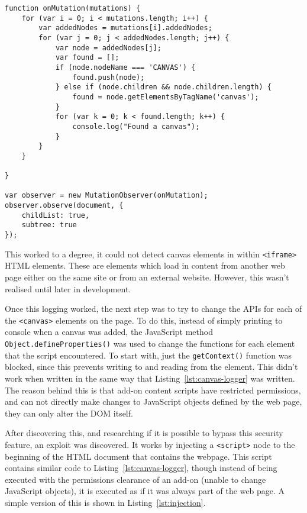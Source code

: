 \begin{lstlisting}[caption={A script that listens to a webpage, and prints to the console when a \texttt{<canvas>} element is added}, label={lst:canvas-logger}]
function onMutation(mutations) {
    for (var i = 0; i < mutations.length; i++) {
        var addedNodes = mutations[i].addedNodes;
        for (var j = 0; j < addedNodes.length; j++) {
            var node = addedNodes[j];
            var found = [];
            if (node.nodeName === 'CANVAS') {
                found.push(node);
            } else if (node.children && node.children.length) {
                found = node.getElementsByTagName('canvas');
            }
            for (var k = 0; k < found.length; k++) {
                console.log("Found a canvas");
            }
        }
    }

}

var observer = new MutationObserver(onMutation);
observer.observe(document, {
    childList: true,
    subtree: true
});
\end{lstlisting}

This worked to a degree, it could not detect canvas elements in within \texttt{<iframe>} HTML elements.
These are elements which load in content from another web page either on the same site or from an external website.
However, this wasn't realised until later in development.

Once this logging worked, the next step was to try to change the APIs for each of the \texttt{<canvas>} elements on the page.
To do this, instead of simply printing to console when a canvas was added, the JavaScript method \texttt{Object.defineProperties()} was used to change the functions for each element that the script encountered.
To start with, just the \texttt{getContext()} function was blocked, since this prevents writing to and reading from the element.
This didn't work when written in the same way that Listing~\ref{lst:canvas-logger} was written.
The reason behind this is that add-on content scripts have restricted permissions, and can not directly make changes to JavaScript objects defined by the web page, they can only alter the DOM itself.

After discovering this, and researching if it is possible to bypass this security feature, an exploit was discovered.
It works by injecting a \texttt{<script>} node to the beginning of the HTML document that contains the webpage.
This script contains similar code to Listing~\ref{lst:canvas-logger}, though instead of being executed with the permissions clearance of an add-on (unable to change JavaScript objects), it is executed as if it was always part of the web page.
A simple version of this is shown in Listing~\ref{lst:injection}.

